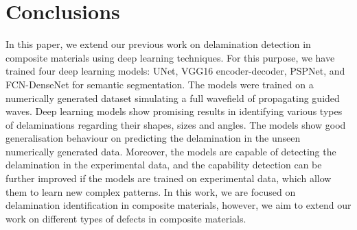\section{Conclusions}
\label{conclusion}
In this paper, we extend our previous work on delamination detection in composite materials using deep learning techniques. 
For this purpose, we have trained four deep learning models: UNet, VGG16 encoder-decoder, PSPNet, and  FCN-DenseNet for semantic segmentation.
The models were trained on a numerically generated dataset simulating a  full wavefield of propagating guided waves.
Deep learning models show promising results in identifying various types of delaminations regarding their shapes, sizes and angles. 
The models show good generalisation behaviour on predicting the delamination in the unseen numerically generated data.
Moreover, the models are capable of detecting the delamination in the experimental data, and the capability detection can be further improved if the models are trained on experimental data, which allow them to learn new complex patterns.
In this work, we are focused on delamination identification in composite materials, however, we aim to extend our work on different types of defects in composite materials.
